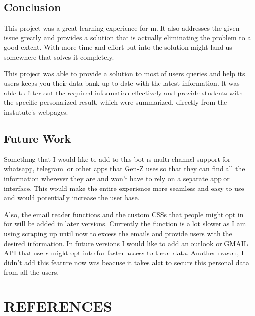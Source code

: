 \documentclass[14pt]{extarticle}
\makeatletter
\newcommand\backmatter{
    \if @openright
        \cleardoublepage
    \else
        \clearpage
    \fi
}
\makeatother
\begin{document}
\subsection{Conclusion}

This project was a great learning experience for m. It also addresses the given issue greatly and provides a solution that is actually eliminating the problem to a good extent. With more time and effort put into the solution might land us somewhere that solves it completely.

This project was able to provide a solution to most of users queries and help its users keeps you their data bank up to date with the latest information. It was able to filter out the required information effectively and provide students with the specific personalized result, which were summarized, directly from the instutute's webpages.

\subsection{Future Work}

Something that I would like to add to this  bot is multi-channel support for whatsapp, telegram, or other apps that Gen-Z uses so that they can find all the information wherever they are and won't have to rely on a separate app or interface. This would make the entire experience more seamless and easy to use and would potentially increase the user base.

Also, the email reader functions and the custom CSSs that people might opt in for will be added in later versions. Currently the function is a lot slower as I am using scraping up until now to excess the emails and provide users with the desired information. In future versions I would like to add an outlook or GMAIL API that users might opt into for faster access to theor data. Another reason, I didn't add this feature now was beacuse it takes alot to secure this personal data from all the users.


\newpage
{}
\section*{REFERENCES}
\end{document}
